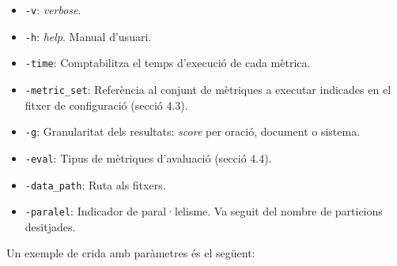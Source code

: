\documentclass[11pt,a4paper]{article}
\begin{document}
\begin{itemize}
\item \texttt{-v}: \textit{verbose}.

\item \texttt{-h}: \textit{help}. Manual d'usuari.

\item \texttt{-time}: Comptabilitza el temps d'execució de cada mètrica.

\item \texttt{-metric\_set}: Referència al conjunt de mètriques a executar indicades en el fitxer de configuració (secció 4.3).



\item \texttt{-g}: Granularitat dels resultats: \textit{score} per oració, document o sistema.

\item \texttt{-eval}: Tipus de mètriques d'avaluació (secció 4.4).

\item \texttt{-data\_path}: Ruta als fitxers.

\item \texttt{-paralel}: Indicador de paral·lelisme. Va seguit del nombre de particions desitjades.

\end{itemize}

Un exemple de crida amb paràmetres és el següent:

\begin{table}[H]
\end{table}
\end{document}
